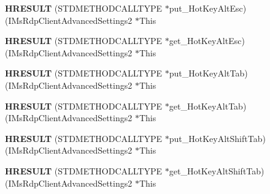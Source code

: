 \begin{DoxyCompactItemize}
\item 
\mbox{\label{struct_i_ms_rdp_client_advanced_settings2_vtbl_a3afd02232257bffb3761e1d5de9c3d6a}} 
{\bfseries H\+R\+E\+S\+U\+LT} (S\+T\+D\+M\+E\+T\+H\+O\+D\+C\+A\+L\+L\+T\+Y\+PE $\ast$put\+\_\+\+Hot\+Key\+Alt\+Esc)(I\+Ms\+Rdp\+Client\+Advanced\+Settings2 $\ast$This
\item 
\mbox{\label{struct_i_ms_rdp_client_advanced_settings2_vtbl_a696f3f039a770546f9084a3314d45915}} 
{\bfseries H\+R\+E\+S\+U\+LT} (S\+T\+D\+M\+E\+T\+H\+O\+D\+C\+A\+L\+L\+T\+Y\+PE $\ast$get\+\_\+\+Hot\+Key\+Alt\+Esc)(I\+Ms\+Rdp\+Client\+Advanced\+Settings2 $\ast$This
\item 
\mbox{\label{struct_i_ms_rdp_client_advanced_settings2_vtbl_a260b3595ee25a774d3cfce340cf03e33}} 
{\bfseries H\+R\+E\+S\+U\+LT} (S\+T\+D\+M\+E\+T\+H\+O\+D\+C\+A\+L\+L\+T\+Y\+PE $\ast$put\+\_\+\+Hot\+Key\+Alt\+Tab)(I\+Ms\+Rdp\+Client\+Advanced\+Settings2 $\ast$This
\item 
\mbox{\label{struct_i_ms_rdp_client_advanced_settings2_vtbl_a20a548d0c84379f03e5af9f5575e6569}} 
{\bfseries H\+R\+E\+S\+U\+LT} (S\+T\+D\+M\+E\+T\+H\+O\+D\+C\+A\+L\+L\+T\+Y\+PE $\ast$get\+\_\+\+Hot\+Key\+Alt\+Tab)(I\+Ms\+Rdp\+Client\+Advanced\+Settings2 $\ast$This
\item 
\mbox{\label{struct_i_ms_rdp_client_advanced_settings2_vtbl_addd7800b45c3510a8b382697eca44497}} 
{\bfseries H\+R\+E\+S\+U\+LT} (S\+T\+D\+M\+E\+T\+H\+O\+D\+C\+A\+L\+L\+T\+Y\+PE $\ast$put\+\_\+\+Hot\+Key\+Alt\+Shift\+Tab)(I\+Ms\+Rdp\+Client\+Advanced\+Settings2 $\ast$This
\item 
\mbox{\label{struct_i_ms_rdp_client_advanced_settings2_vtbl_a8d68f3945f877cb917c52b5a1e95fbc7}} 
{\bfseries H\+R\+E\+S\+U\+LT} (S\+T\+D\+M\+E\+T\+H\+O\+D\+C\+A\+L\+L\+T\+Y\+PE $\ast$get\+\_\+\+Hot\+Key\+Alt\+Shift\+Tab)(I\+Ms\+Rdp\+Client\+Advanced\+Settings2 $\ast$This
\item 
\mbox{\label{struct_i_ms_rdp_client_advanced_settings2_vtbl_ad0ae0371f3101111939477fd05a5ef48}} 

\end{DoxyCompactItemize}
